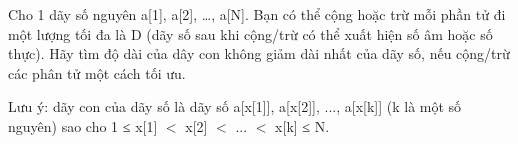 Cho 1 dãy số nguyên a[1], a[2], …, a[N]. Bạn có thể cộng hoặc trừ mỗi phần tử đi một lượng tối đa là D (dãy số sau khi cộng/trừ có thể xuất hiện số âm hoặc số thực). Hãy tìm độ dài của dây con không giảm dài nhất của dãy số, nếu cộng/trừ các phân tử một cách tối ưu.  

Lưu ý: dãy con của dãy số là dãy số a[x[1]], a[x[2]], ..., a[x[k]] (k là một số nguyên) sao cho 1 ≤ x[1] $<$ x[2] $<$ ... $<$ x[k] ≤ N.
